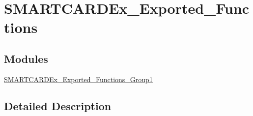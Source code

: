 \hypertarget{group___s_m_a_r_t_c_a_r_d_ex___exported___functions}{}\section{S\+M\+A\+R\+T\+C\+A\+R\+D\+Ex\+\_\+\+Exported\+\_\+\+Functions}
\label{group___s_m_a_r_t_c_a_r_d_ex___exported___functions}
\subsection*{Modules}
\begin{DoxyCompactItemize}
\item 
\hyperlink{group___s_m_a_r_t_c_a_r_d_ex___exported___functions___group1}{S\+M\+A\+R\+T\+C\+A\+R\+D\+Ex\+\_\+\+Exported\+\_\+\+Functions\+\_\+\+Group1}
\end{DoxyCompactItemize}


\subsection{Detailed Description}
